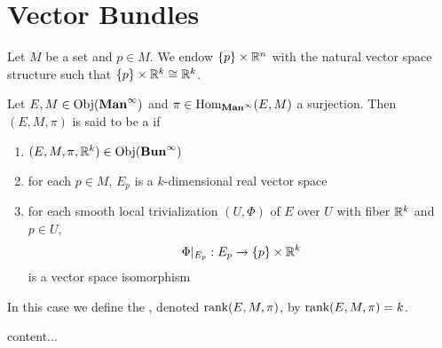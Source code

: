 \documentclass{book}
\begin{document}
	\newpage
	\chapter{Vector Bundles}

	\begin{note}
		Let $M$ be a set and $p \in M$. We endow $\{p\} \times \mathbb{R}^n$ with the natural vector space structure such that $\{p\} \times \mathbb{R}^k \cong \mathbb{R}^k$.
	\end{note}

	\begin{defn} 
		Let $E,M \in \operatorname{Obj}(\operatorname*{\text{\textbf{Man}}^{\infty}})$ and $\pi \in \operatorname{Hom}_{\operatorname*{\text{\textbf{Man}}^{\infty}}}(E, M)$ a surjection. Then $(E, M, \pi)$ is said to be a  if 
		\begin{enumerate}
			\item $(E, M, \pi, \mathbb{R}^k) \in \operatorname{Obj}(\operatorname*{\text{\textbf{Bun}}^{\infty}})$
			\item for each $p \in M$, $E_p$ is a $k$-dimensional real vector space
			\item for each smooth local trivialization $(U, \Phi)$ of $E$ over $U$ with fiber $\mathbb{R}^k$ and $p \in U$, $$\Phi|_{E_p}: E_p \rightarrow \{p\} \times \mathbb{R}^k$$ is a vector space isomorphism
		\end{enumerate}
		In this case we define the , denoted $\operatorname{\text{rank}} (E, M, \pi)$, by $ \operatorname{\text{rank}} (E, M, \pi) = k$.
	\end{defn}

\begin{defn}
	content...
\end{defn}
\end{document}
